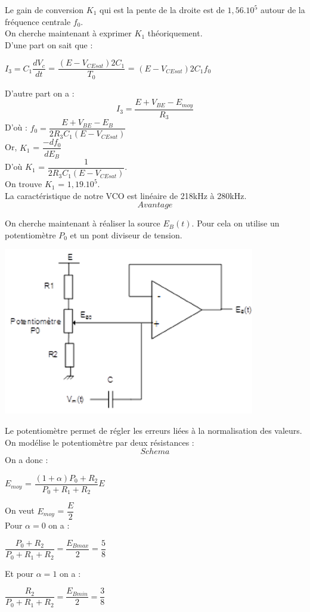 \documentclass[a4paper]{report}
\begin{document}
Le gain de conversion $K_1$ qui est la pente de la droite est de $1,56.10^5$ autour de la fréquence centrale $f_0$.\\

On cherche maintenant à exprimer $K_1$ théoriquement.\\
D'une part on sait que :
\begin{center}
 $I_3 = C_1 \dfrac{dV_c}{dt}$ = $\dfrac{(E-
V_{CEsat})2C_1}{T_0}$ = $(E-V_{CEsat})2C_1f_0$
\end{center}

D'autre part on a : \\
$$I_3 = \dfrac{E+V_{BE}-E_{moy}}{R_3}$$
D'où : \hspace{4cm} $f_0 = \dfrac{E+V_{BE}-E_B}{2R_3C_1(E-V_{CEsat})} $\\
Or,\hspace{5cm} $K_1$ = $\dfrac{-df_0}{dE_B}$\\
D'où \hspace{4cm} $K_1$ = $\dfrac{1}{2R_3C_1(E-V_{CEsat})}$.\\ 
On trouve $K_1$ = $1,19.10^5$.\\
La caractéristique de notre VCO est linéaire de 218kHz à 280kHz.\\

$$Avantage$$

On cherche maintenant à réaliser la source $E_B(t)$. Pour cela on utilise un potentiomètre $P_0$ et un pont diviseur de tension.\\
\begin{center}
\includegraphics[width=.5\textwidth]{POT.PNG}
\end{center}

Le potentiomètre permet de régler les erreurs liées à la normalisation des valeurs.\\
On modélise le potentiomètre par deux résistances : \\
$$Schema$$
On a donc : \\
\begin{center}
$E_{moy}$ = $ \dfrac{(1+\alpha)P_0 + R_2}{P_0 + R_1 + R_2} E$\\
\end{center}
On veut $E_{moy}$ = $\dfrac{E}{2}$\\
Pour $\alpha = 0$ on a : \\
\begin{center}
$\dfrac{P_0 + R_2}{P_0 + R_1 + R_2} = \dfrac{E_{Bmax}}{2} = \dfrac{5}{8}$\\
\end{center}
Et pour $\alpha = 1$ on a : \\
\begin{center}
$\dfrac{R_2}{P_0 + R_1 + R_2}= \dfrac{E_{Bmin}}{2} = \dfrac{3}{8}$\\
\end{center}
\end{document}

